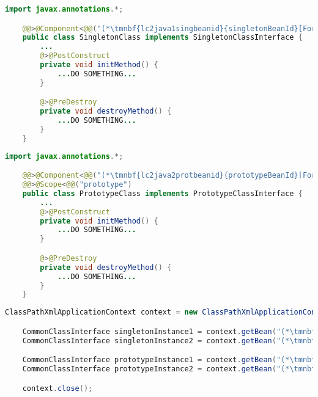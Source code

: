 \example
\enlargethispage{10mm}
\begin{lstlisting}[language=Java, title={Singleton bean class}]
    import javax.annotations.*;

    @@>@Component<@@("(*\tmnbf{lc2java1singbeanid}{singletonBeanId}[ForestGreen]*)")
    public class SingletonClass implements SingletonClassInterface {
        ...
        @>@PostConstruct
        private void initMethod() {
            ...DO SOMETHING...
        }

        @>@PreDestroy
        private void destroyMethod() {
            ...DO SOMETHING...
        }
    }
\end{lstlisting}
\begin{lstlisting}[language=Java, title={Prototype bean class}]
    import javax.annotations.*;

    @@>@Component<@@("(*\tmnbf{lc2java2protbeanid}{prototypeBeanId}[ForestGreen]*)")
    @@>@Scope<@@("prototype")
    public class PrototypeClass implements PrototypeClassInterface {
        ...
        @>@PostConstruct
        private void initMethod() {
            ...DO SOMETHING...
        }

        @>@PreDestroy
        private void destroyMethod() {
            ...DO SOMETHING...
        }
    }
\end{lstlisting}
\newpage
\begin{lstlisting}[language=Java, title={Usage}]
    ClassPathXmlApplicationContext context = new ClassPathXmlApplicationContext("configurationFile.xml");

    CommonClassInterface singletonInstance1 = context.getBean("(*\tmnbf{lc2java3singbeanid1}{singletonBeanId}[ForestGreen]*)", SingletonClassInterface.class);
    CommonClassInterface singletonInstance2 = context.getBean("(*\tmnbf{lc2java3singbeanid2}{singletonBeanId}[ForestGreen]*)", SingletonClassInterface.class);

    CommonClassInterface prototypeInstance1 = context.getBean("(*\tmnbf{lc2java3protbeanid1}{prototypeBeanId}[ForestGreen]*)", PrototypeClassInterface.class);
    CommonClassInterface prototypeInstance2 = context.getBean("(*\tmnbf{lc2java3protbeanid2}{prototypeBeanId}[ForestGreen]*)", PrototypeClassInterface.class);

    context.close();
\end{lstlisting}
